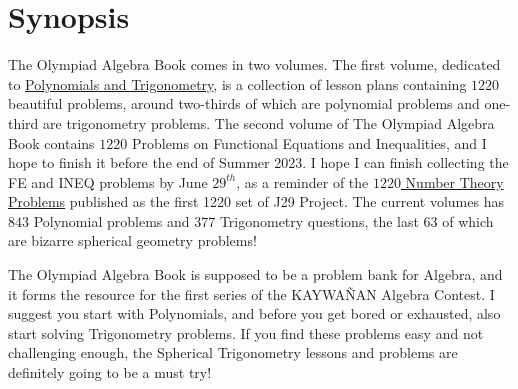 \documentclass[12pt,a4paper]{memoir}
\theoremstyle{definition}
\begin{document}
	\section*{Synopsis}
		The Olympiad Algebra Book comes in two volumes. The first volume, dedicated to \href{https://www.academia.edu/101938068/The_Olympiad_Algebra_Book_Vol_I_1220_Polynomials_and_Trigonometry_Problems}{Polynomials and Trigonometry}, is a collection of lesson plans containing $1220$ beautiful problems, around two-thirds of which are polynomial problems and one-third are trigonometry problems. The second volume of The Olympiad Algebra Book contains $1220$ Problems on Functional Equations and Inequalities, and I hope to finish it before the end of Summer 2023. I hope I can finish collecting the FE and INEQ problems by June $29^{th}$, as a reminder of the \href{https://www.academia.edu/29934442/1220_Number_Theory_Problems_J29_Project}{$1220$ Number Theory Problems} published as the first 1220 set of J29 Project. The current volumes has $843$ Polynomial problems and $377$ Trigonometry questions, the last $63$ of which are bizarre spherical geometry problems! 
		
		
		\vspace{0.5em}
		
		The Olympiad Algebra Book is supposed to be a problem bank for Algebra, and it forms the resource for the first series of the KAYWAÑAN Algebra Contest. I suggest you start with Polynomials, and before you get bored or exhausted, also start solving Trigonometry problems. If you find these problems easy and not challenging enough, the Spherical Trigonometry lessons and problems are definitely going to be a must try!
		
		
		\vspace{0.5em}
		
\end{document}
